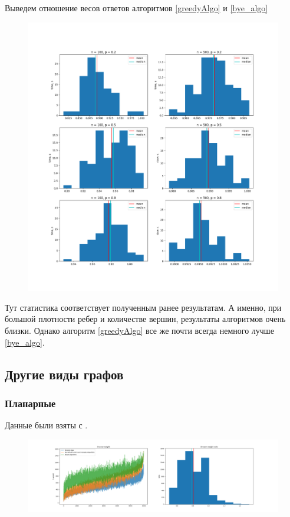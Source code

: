 \documentclass{article}
\theoremstyle{definition}
\begin{document}
  Выведем отношение весов ответов алгоритмов \ref{greedyAlgo} и \ref{bye_algo}
  \begin{figure}[H]
    \includegraphics[scale=0.5]{img/gnp_ratio_hists}
  \end{figure}
  Тут статистика соответствует полученным ранее результатам. 
  А именно, при большой плотности ребер и количестве вершин, результаты алгоритмов очень близки.
  Однако алгоритм \ref{greedyAlgo} все же почти всегда немного лучше \ref{bye_algo}.
  \subsection{Другие виды графов}
  \subsubsection{Планарные}
  Данные были взяты с \cite{graphs_source}.
  \begin{figure}[H]
    \includegraphics[scale=0.3]{img/planar8_quick}
  \end{figure}
\end{document}
